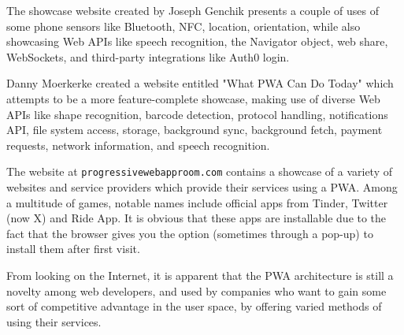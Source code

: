 The showcase website created by Joseph Genchik \cite{GenchikPWAShowcase} presents a couple of uses of some phone sensors like Bluetooth, NFC, location, orientation, while also showcasing Web APIs like speech recognition, the Navigator object, web share, WebSockets, and third-party integrations like Auth0 login.

Danny Moerkerke created a website entitled "What PWA Can Do Today" \cite{MoerkerkePWAShowcase} which attempts to be a more feature-complete showcase, making use of diverse Web APIs like shape recognition, barcode detection, protocol handling, notifications API, file system access, storage, background sync, background fetch, payment requests, network information, and speech recognition.

The website at \verb|progressivewebapproom.com| \cite{PWARoom} contains a showcase of a variety of websites and service providers which provide their services using a PWA. Among a multitude of games, notable names include official apps from Tinder, Twitter (now X) and Ride App. It is obvious that these apps are installable due to the fact that the browser gives you the option (sometimes through a pop-up) to install them after first visit.

From looking on the Internet, it is apparent that the PWA architecture is still a novelty among web developers, and used by companies who want to gain some sort of competitive advantage in the user space, by offering varied methods of using their services.
